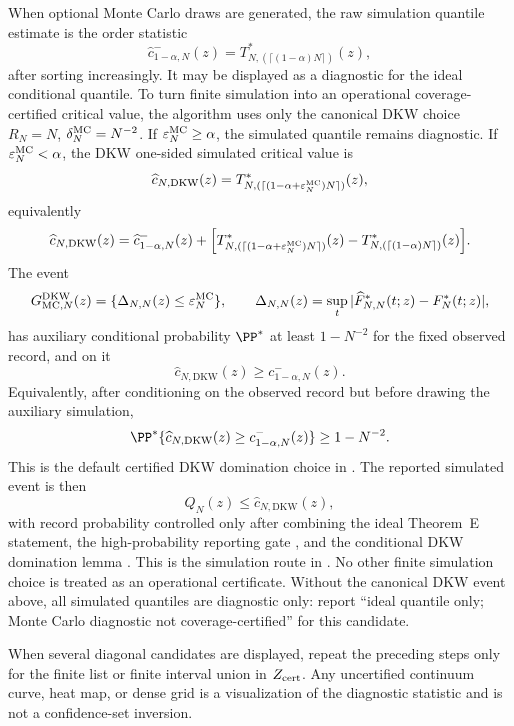When optional Monte Carlo draws are generated, the raw simulation quantile
estimate is the order statistic
\[
\widehat c^{-}_{1-\alpha,N}(z)
=T_{N,(\lceil(1-\alpha)N\rceil)}^{\ast}(z),
\]
after sorting increasingly.  It may be displayed as a diagnostic for the ideal
conditional quantile.  To turn finite simulation into an operational
coverage-certified critical value, the algorithm uses only the canonical DKW
choice \(R_N=N\), \(\delta_N^{\rm MC}=N^{-2}\).  If
\(\varepsilon_N^{\rm MC}\ge\alpha\), the simulated quantile remains
diagnostic.  If \(\varepsilon_N^{\rm MC}<\alpha\), the DKW one-sided simulated
critical value is
\[
\widehat c_{N,\mathrm{DKW}}(z)
=T_{N,(\lceil(1-\alpha+\varepsilon_N^{\rm MC})N\rceil)}^\ast(z),
\]
equivalently
\[
\widehat c_{N,\mathrm{DKW}}(z)
=\widehat c^{-}_{1-\alpha,N}(z)
+\Bigl[
T_{N,(\lceil(1-\alpha+\varepsilon_N^{\rm MC})N\rceil)}^\ast(z)
-T_{N,(\lceil(1-\alpha)N\rceil)}^\ast(z)
\Bigr].
\]
The event
\[
G_{\mathrm{MC},N}^{\mathrm{DKW}}(z)
=\{\Delta_{N,N}(z)\le\varepsilon_N^{\rm MC}\},
\qquad
\Delta_{N,N}(z)=
\sup_t|\widehat F^\ast_{N,N}(t;z)-F_N^\ast(t;z)|,
\]
has auxiliary conditional probability \(\PP^\ast\) at least \(1-N^{-2}\) for
the fixed observed record, and on it
\[
\widehat c_{N,\mathrm{DKW}}(z)
\ge c^{-}_{1-\alpha,N}(z).
\]
Equivalently, after conditioning on the observed record but before drawing the
auxiliary simulation,
\[
\PP^\ast\{\widehat c_{N,\mathrm{DKW}}(z)
\ge c^{-}_{1-\alpha,N}(z)\}\ge1-N^{-2}.
\]
This is the default certified DKW domination choice in
.  The reported simulated event is then
\[
Q_N(z)\le
\widehat c_{N,\mathrm{DKW}}(z),
\]
with record probability controlled only after combining the ideal Theorem~E
statement, the high-probability reporting gate
, and the conditional DKW
domination lemma
.  This is the simulation route in
.  No other finite simulation choice is
treated as an operational certificate.  Without the canonical DKW event above,
all simulated quantiles are diagnostic only: report
``ideal quantile only; Monte Carlo diagnostic not coverage-certified'' for
this candidate.

When several diagonal candidates are displayed, repeat the preceding steps
only for the finite list or finite interval union in \(Z_{\rm cert}\).  Any
uncertified continuum curve, heat map, or dense grid is a visualization of the
diagnostic statistic and is not a confidence-set inversion.

